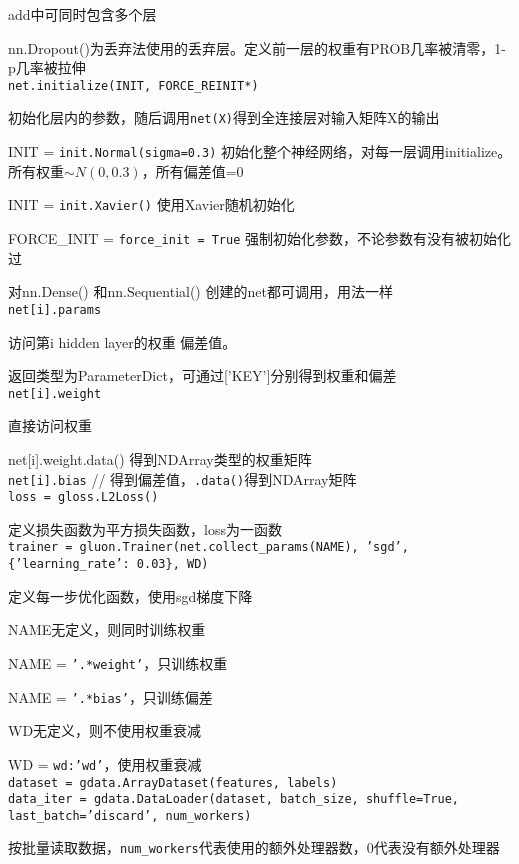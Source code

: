 \documentclass[UTF8]{ctexart}
\begin{document}
  add中可同时包含多个层
  
  nn.Dropout()为丢弃法使用的丢弃层。定义前一层的权重有PROB几率被清零，1-p几率被拉伸\\
\texttt{net.initialize(INIT, FORCE\_REINIT*)} 

  初始化层内的参数，随后调用\texttt{net(X)}得到全连接层对输入矩阵X的输出
  
  INIT = \texttt{init.Normal(sigma=0.3)} 初始化整个神经网络，对每一层调用initialize。所有权重$\sim N(0, 0.3)$，所有偏差值=0

  INIT = \texttt{init.Xavier()} 使用Xavier随机初始化
  
  FORCE\_INIT = \texttt{force\_init = True} 强制初始化参数，不论参数有没有被初始化过
  
  对nn.Dense() 和nn.Sequential() 创建的net都可调用，用法一样\\
\texttt{net[i].params}

  访问第i hidden layer的权重 偏差值。
  
  返回类型为ParameterDict，可通过['KEY']分别得到权重和偏差\\
\texttt{net[i].weight} 
  
  直接访问权重

  net[i].weight.data() 得到NDArray类型的权重矩阵\\
\texttt{net[i].bias} // 得到偏差值，\texttt{.data()}得到NDArray矩阵\\
\texttt{loss = gloss.L2Loss()}
  
  定义损失函数为平方损失函数，loss为一函数\\
\texttt{trainer = gluon.Trainer(net.collect\_params(NAME), 'sgd', \{'learning\_rate': 0.03\}, WD)}

  定义每一步优化函数，使用sgd梯度下降
  
  NAME无定义，则同时训练权重
  
  \quad NAME = \texttt{'.*weight'}，只训练权重 
  
  \quad NAME = \texttt{'.*bias'}，只训练偏差
    
  WD无定义，则不使用权重衰减
  
  \quad WD = \texttt{wd:'wd'}，使用权重衰减\\
\texttt{dataset = gdata.ArrayDataset(features, labels)}\\
\texttt{data\_iter = gdata.DataLoader(dataset, batch\_size, shuffle=True, last\_batch='discard', num\_workers)}

  按批量读取数据，\texttt{num\_workers}代表使用的额外处理器数，0代表没有额外处理器
  
\end{document}
